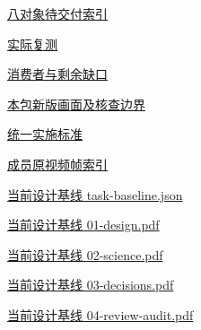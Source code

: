 \documentclass[11pt,a4paper]{article}
\begin{document}
\href{file:///D:/Agent/srp/agent/tasks/W-04/outputs/handover-index.json}{八对象待交付索引}


\href{file:///D:/Agent/srp/agent/tasks/W-04/evidence/verification.json}{实际复测}


\href{file:///D:/Agent/srp/agent/tasks/W-04/evidence/consumer-impact.md}{消费者与剩余缺口}


\href{file:///D:/Agent/srp/agent/tasks/W-04/outputs/current-implementation-evidence.md}{本包新版画面及核查边界}


\href{file:///D:/Agent/srp/agent/design/weather/2026-10-08_Storm\%E4\%B8\%8E\%E7\%BA\%AF\%E7\%B2\%92\%E5\%AD\%90\%E5\%8F\%8C\%E7\%8E\%AF\%E5\%AE\%9E\%E6\%96\%BD\%E6\%A0\%87\%E5\%87\%86.md}{统一实施标准}


\href{file:///D:/Agent/srp/human/assets/previews/2026-10-08/member-storm-particle-rings/frame-index.json}{成员原视频帧索引}


\href{file:///D:/Agent/srp/agent/design/design-foundation-20261008/task-baseline.json}{当前设计基线 task-\allowbreak{}baseline.json}


\href{file:///D:/Agent/srp/agent/design/design-foundation-20261008/01-design.pdf}{当前设计基线 01-\allowbreak{}design.pdf}


\href{file:///D:/Agent/srp/agent/design/design-foundation-20261008/02-science.pdf}{当前设计基线 02-\allowbreak{}science.pdf}


\href{file:///D:/Agent/srp/agent/design/design-foundation-20261008/03-decisions.pdf}{当前设计基线 03-\allowbreak{}decisions.pdf}


\href{file:///D:/Agent/srp/agent/design/design-foundation-20261008/04-review-audit.pdf}{当前设计基线 04-\allowbreak{}review-\allowbreak{}audit.pdf}
\end{document}
